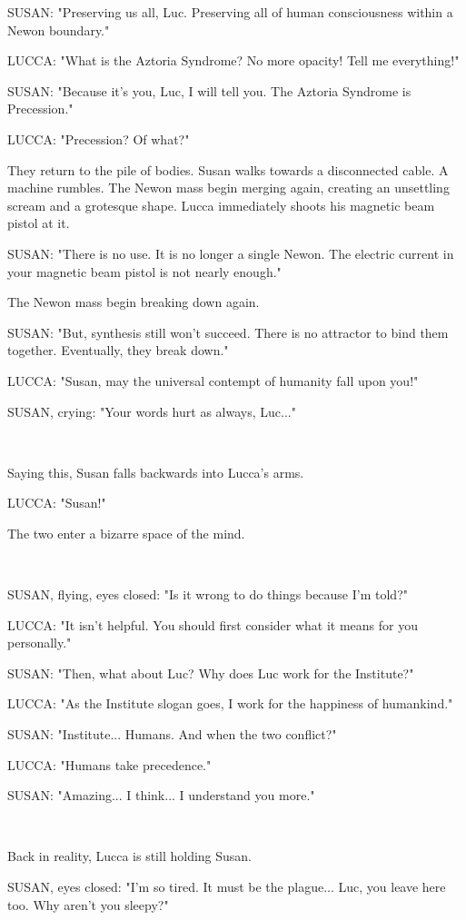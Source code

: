 \documentclass[11pt]{article}
\begin{document}
SUSAN: "Preserving us all, Luc. 
Preserving all of human consciousness within a Newon boundary."

LUCCA: "What is the Aztoria Syndrome?
No more opacity!
Tell me everything!"

SUSAN: "Because it's you, Luc, I will tell you.
The Aztoria Syndrome is Precession."

LUCCA: "Precession? Of what?"

They return to the pile of bodies. 
Susan walks towards a disconnected cable.
A machine rumbles.
The Newon mass begin merging again, creating an unsettling scream and a grotesque shape.
Lucca immediately shoots his magnetic beam pistol at it.

SUSAN: "There is no use. 
It is no longer a single Newon. 
The electric current in your magnetic beam pistol is not nearly enough."

The Newon mass begin breaking down again.

SUSAN: "But, synthesis still won't succeed.
There is no attractor to bind them together.
Eventually, they break down."

LUCCA: "Susan, may the universal contempt of humanity fall upon you!"

SUSAN, crying: "Your words hurt as always, Luc..."

\ 

Saying this, Susan falls backwards into Lucca's arms.

LUCCA: "Susan!"

The two enter a bizarre space of the mind.

\ 

SUSAN, flying, eyes closed: "Is it wrong to do things because I'm told?"

LUCCA: "It isn't helpful.
You should first consider what it means for you personally."

SUSAN: "Then, what about Luc? 
Why does Luc work for the Institute?"

LUCCA: "As the Institute slogan goes, I work for the happiness of humankind."

SUSAN: "Institute... Humans. And when the two conflict?"

LUCCA: "Humans take precedence."

SUSAN: "Amazing... I think... I understand you more."


\ 

Back in reality, Lucca is still holding Susan.

SUSAN, eyes closed: "I'm so tired.
It must be the plague...
Luc, you leave here too.
Why aren't you sleepy?"
\end{document}

